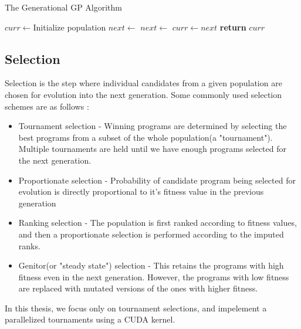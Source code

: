 \begin{algorithm}
  \caption{The Generational GP Algorithm}\label{gpalgo}
  \begin{algorithmic}[1]
  \State $curr \gets $Initialize population  
  \State {} 
  \Repeat
  \State $next \gets $ 
  \State $next \gets $  
  \State {}
  \State $curr \gets next$
  \label{gpalgoendloop}
  \State \textbf{return} $curr$
  \EndProcedure
  \end{algorithmic}
\end{algorithm}

\subsection{Selection}
\label{subsec:selection}
Selection is the step where individual candidates from a given population are chosen for evolution into the next generation. Some commonly used selection schemes are as follows \cite{GOLDBERG199169}:
\begin{itemize}
  \item Tournament selection - Winning programs are determined by selecting the best programs from a subset of the whole population(a "tournament"). Multiple tournaments are held until we have enough programs selected for the next generation. 
  \item Proportionate selection - Probability of candidate program being selected for evolution is directly proportional to it's fitness value in the previous generation
  \item Ranking selection - The population is first ranked according to fitness values, and then a proportionate selection is performed according to the imputed ranks. 
  \item Genitor(or "steady state") selection - This retains the programs with high fitness even in the next generation. However, the programs with low fitness are replaced with mutated versions of the ones with higher fitness.
\end{itemize}

In this thesis, we focus only on tournament selections, and impelement a parallelized tournaments using a CUDA kernel. 
